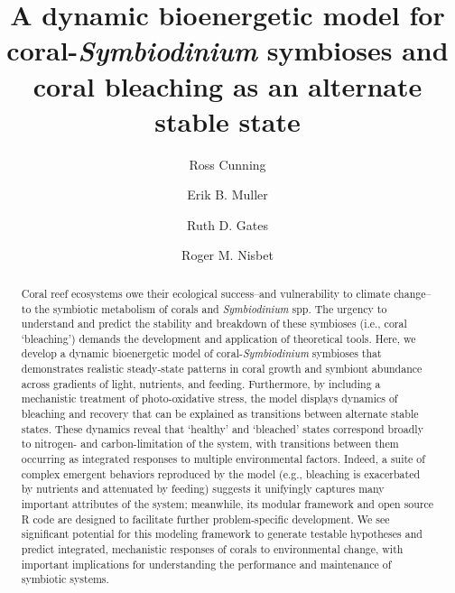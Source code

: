 \documentclass[]{elsarticle} %
\begin{document}
\begin{frontmatter}

  \title{A dynamic bioenergetic model for coral-\emph{Symbiodinium} symbioses and
coral bleaching as an alternate stable state}
    \author[University of Hawaii]{Ross Cunning}
    \author[UCSB, MSI]{Erik B. Muller}
  
  
    \author[HIMB]{Ruth D. Gates}
  
  
    \author[UCSB]{Roger M. Nisbet}
  
  
      \address[HIMB]{Hawaii Institute of Marine Biology, School of Ocean and Earth Science
and Technology, University of Hawaii at Manoa, USA}
    \address[UCSB]{Department of Ecology, Evolution, and Marine Biology, University of
California, Santa Barbara, USA}
    \address[MSI]{Marine Science Institute, University of California, Santa Barbara, USA}
  
  \begin{abstract}
  Coral reef ecosystems owe their ecological success--and vulnerability to
  climate change--to the symbiotic metabolism of corals and
  \emph{Symbiodinium} spp. The urgency to understand and predict the
  stability and breakdown of these symbioses (i.e., coral `bleaching')
  demands the development and application of theoretical tools. Here, we
  develop a dynamic bioenergetic model of coral-\emph{Symbiodinium}
  symbioses that demonstrates realistic steady-state patterns in coral
  growth and symbiont abundance across gradients of light, nutrients, and
  feeding. Furthermore, by including a mechanistic treatment of
  photo-oxidative stress, the model displays dynamics of bleaching and
  recovery that can be explained as transitions between alternate stable
  states. These dynamics reveal that `healthy' and `bleached' states
  correspond broadly to nitrogen- and carbon-limitation of the system,
  with transitions between them occurring as integrated responses to
  multiple environmental factors. Indeed, a suite of complex emergent
  behaviors reproduced by the model (e.g., bleaching is exacerbated by
  nutrients and attenuated by feeding) suggests it unifyingly captures
  many important attributes of the system; meanwhile, its modular
  framework and open source R code are designed to facilitate further
  problem-specific development. We see significant potential for this
  modeling framework to generate testable hypotheses and predict
  integrated, mechanistic responses of corals to environmental change,
  with important implications for understanding the performance and
  maintenance of symbiotic systems.
  \end{abstract}
  
 \end{frontmatter}
\end{document}
